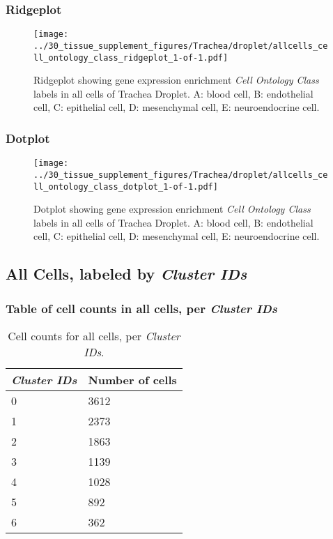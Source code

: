 \subsubsection{Ridgeplot}
\begin{figure}[h]
\centering
\texttt{[image: ../30\_tissue\_supplement\_figures/Trachea/droplet/allcells\_cell\_ontology\_class\_ridgeplot\_1-of-1.pdf]}

\caption{ Ridgeplot  showing gene expression enrichment \emph{Cell Ontology Class} labels in all cells of Trachea Droplet. A: blood cell, B: endothelial cell, C: epithelial cell, D: mesenchymal cell, E: neuroendocrine cell.}
\end{figure}


\clearpage

\subsubsection{Dotplot}
\begin{figure}[h]
\centering
\texttt{[image: ../30\_tissue\_supplement\_figures/Trachea/droplet/allcells\_cell\_ontology\_class\_dotplot\_1-of-1.pdf]}

\caption{ Dotplot  showing gene expression enrichment \emph{Cell Ontology Class} labels in all cells of Trachea Droplet. A: blood cell, B: endothelial cell, C: epithelial cell, D: mesenchymal cell, E: neuroendocrine cell.}
\end{figure}


\clearpage

\subsection{All Cells, labeled by \emph{Cluster IDs}}
\subsubsection{Table of cell counts in all cells, per \emph{Cluster IDs}}\begin{table}[h]
\centering
\label{my-label}
\begin{tabular}{@{}ll@{}}
\toprule

\emph{Cluster IDs}& Number of cells \\ \midrule
0 & 3612 \\

1 & 2373 \\

2 & 1863 \\

3 & 1139 \\

4 & 1028 \\

5 & 892 \\

6 & 362 \\
\bottomrule
\end{tabular}
\caption{Cell counts for all cells, per \emph{Cluster IDs}.}
\end{table}

